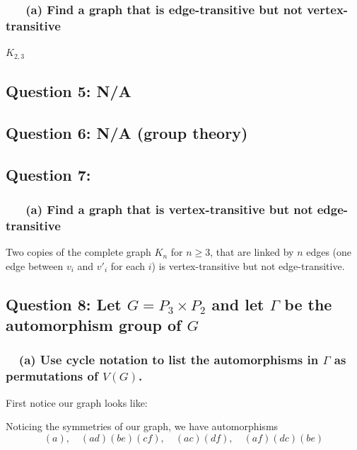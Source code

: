 \documentclass[letterpaper, 11pt]{article}
\newcommand{\1}{\mathds{1}}	%
\theoremstyle{definition}
\begin{document}
\subsubsection*{\ \ \ (a) Find a graph that is edge-transitive but not vertex-transitive}
$K_{2,3}$

\subsection*{Question 5: N/A}

\subsection*{Question 6: N/A (group theory)}

\subsection*{Question 7: }
\subsubsection*{\ \ \ (a) Find a graph that is vertex-transitive but not edge-transitive}
Two copies of the complete graph $K_n$ for $n\ge 3$, that are linked by $n$ edges (one edge between $v_i$ and $v'_i$ for each $i$) is vertex-transitive but not edge-transitive.
\subsection*{Question 8: Let $G = P_3 \times P_2$ and let $\Gamma$ be the automorphism group of $G$}
\subsubsection*{ \ \ (a) Use cycle notation to list the automorphisms in $\Gamma$ as permutations of $V(G)$.}
First notice our graph looks like:

\begin{center}
\end{center}
Noticing the symmetries of our graph, we have automorphisms \[
(a), \quad (ad)(be)(cf), \quad (ac)(df), \quad (af)(dc)(be)
\]
\end{document}
